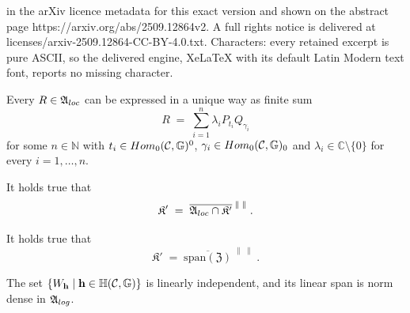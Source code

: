 \documentclass[10pt,a4paper]{amsart}
\newcommand{\f}[1]{\mathcal{#1}}
\newcommand{\n}[1]{\mathbb{#1}}
\begin{document}
in the arXiv licence metadata for this exact version and shown on the abstract page https://arxiv.org/abs/2509.12864v2. A full rights notice is delivered at licenses/arxiv-2509.12864-CC-BY-4.0.txt. Characters: every retained excerpt is pure ASCII, so the delivered engine, XeLaTeX with its default Latin Modern text font, reports no missing character.
	\begin{lemma}\label{lemm:lin_indip_g}
		Every $R\in \mathfrak{A}_{\rm loc}$ can be expressed in a unique way as finite sum
		\[
		R\;=\;\sum_{i=1}^n\lambda_{i}P_{t_i}Q_{\gamma_i}
		\]
		for some $n\in\n{N}$ with $t_i\in {\rm Hom}_0(\f{C},\n{G})^0$, $\gamma_i\in {\rm Hom}_0(\f{C},\n{G})_0$ and $\lambda_i\in\n{C}\setminus\{0\}$ for every $i=1,\ldots,n$.
	\end{lemma}

	\begin{lemma}\label{lemma:commutant_loc}
		It holds true that
		\[
		\mathfrak{K}' 
		\;=\;  \overline{\mathfrak{A}_{\rm loc}\cap\mathfrak{K}'}^{\;\|\;\|}
		\;.
		\]
	\end{lemma}

	\begin{lemma}\label{Lem:span-K'}
		It holds true that
		\[
		\mathfrak{K}'\;=\;\overline{\mathrm{span}(\mathfrak{Z})}^{\;\|\;\|}\;.
		\]
	\end{lemma}

	\begin{lemma}\label{lem:linear_independence_logical}
		The set
		$\left\{W_{\bf h}\;\middle|\;{\bf h}\in\n{H}(\f{C},\n{G})\right\}
		$
		is linearly independent, and its linear span is norm dense in $\mathfrak{A}_{\rm log}$.
	\end{lemma}
\end{document}
